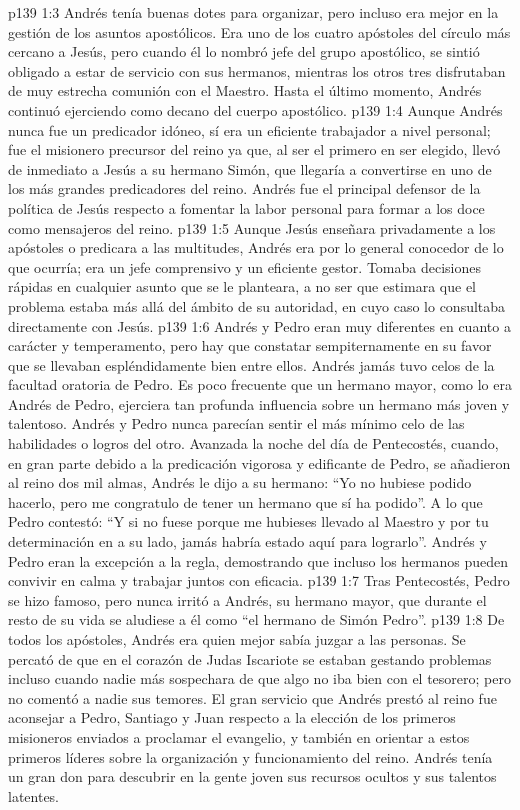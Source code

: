 \vs p139 1:3 \pc Andrés tenía buenas dotes para organizar, pero incluso era mejor en la gestión de los asuntos apostólicos. Era uno de los cuatro apóstoles del círculo más cercano a Jesús, pero cuando él lo nombró jefe del grupo apostólico, se sintió obligado a estar de servicio con sus hermanos, mientras los otros tres disfrutaban de muy estrecha comunión con el Maestro. Hasta el último momento, Andrés continuó ejerciendo como decano del cuerpo apostólico.
\vs p139 1:4 Aunque Andrés nunca fue un predicador idóneo, sí era un eficiente trabajador a nivel personal; fue el misionero precursor del reino ya que, al ser el primero en ser elegido, llevó de inmediato a Jesús a su hermano Simón, que llegaría a convertirse en uno de los más grandes predicadores del reino. Andrés fue el principal defensor de la política de Jesús respecto a fomentar la labor personal para formar a los doce como mensajeros del reino.
\vs p139 1:5 Aunque Jesús enseñara privadamente a los apóstoles o predicara a las multitudes, Andrés era por lo general conocedor de lo que ocurría; era un jefe comprensivo y un eficiente gestor. Tomaba decisiones rápidas en cualquier asunto que se le planteara, a no ser que estimara que el problema estaba más allá del ámbito de su autoridad, en cuyo caso lo consultaba directamente con Jesús.
\vs p139 1:6 \pc Andrés y Pedro eran muy diferentes en cuanto a carácter y temperamento, pero hay que constatar sempiternamente en su favor que se llevaban espléndidamente bien entre ellos. Andrés jamás tuvo celos de la facultad oratoria de Pedro. Es poco frecuente que un hermano mayor, como lo era Andrés de Pedro, ejerciera tan profunda influencia sobre un hermano más joven y talentoso. Andrés y Pedro nunca parecían sentir el más mínimo celo de las habilidades o logros del otro. Avanzada la noche del día de Pentecostés, cuando, en gran parte debido a la predicación vigorosa y edificante de Pedro, se añadieron al reino dos mil almas, Andrés le dijo a su hermano: “Yo no hubiese podido hacerlo, pero me congratulo de tener un hermano que sí ha podido”. A lo que Pedro contestó: “Y si no fuese porque me hubieses llevado al Maestro y por tu determinación en  a su lado, jamás habría estado aquí para lograrlo”. Andrés y Pedro eran la excepción a la regla, demostrando que incluso los hermanos pueden convivir en calma y trabajar juntos con eficacia.
\vs p139 1:7 Tras Pentecostés, Pedro se hizo famoso, pero nunca irritó a Andrés, su hermano mayor, que durante el resto de su vida se aludiese a él como “el hermano de Simón Pedro”.
\vs p139 1:8 \pc De todos los apóstoles, Andrés era quien mejor sabía juzgar a las personas. Se percató de que en el corazón de Judas Iscariote se estaban gestando problemas incluso cuando nadie más sospechara de que algo no iba bien con el tesorero; pero no comentó a nadie sus temores. El gran servicio que Andrés prestó al reino fue aconsejar a Pedro, Santiago y Juan respecto a la elección de los primeros misioneros enviados a proclamar el evangelio, y también en orientar a estos primeros líderes sobre la organización y funcionamiento del reino. Andrés tenía un gran don para descubrir en la gente joven sus recursos ocultos y sus talentos latentes.
